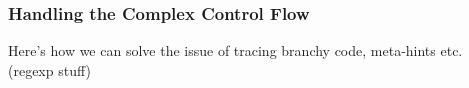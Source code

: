 \subsubsection{Handling the Complex Control Flow}
\label{subsubsec:meta-hints}

Here's how we can solve the issue of tracing branchy code, meta-hints
etc. (regexp stuff)
